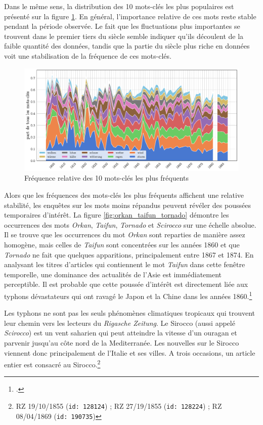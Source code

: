 \documentclass[a4paper,twoside,12pt]{article}
\begin{document}
Dans le même sens, la distribution des 10 mots-clés les plus populaires est présenté sur la figure \ref{fig:top_keywords10}. En général, l'importance relative de ces mots reste stable pendant la période observée. Le fait que les fluctuations plus importantes se trouvent dans le premier tiers du siècle semble indiquer qu'ils découlent de la faible quantité des données, tandis que la partie du siècle plus riche en données voit une stabilisation de la fréquence de ces mots-clés.

\begin{figure}[h]
    \centering
    \includegraphics[width=\textwidth]{images/10_most_frequent_ents.pdf}
    \caption{Fréquence relative des 10 mots-clés les plus fréquents}
    \label{fig:top_keywords10}
\end{figure}

Alors que les fréquences des mots-clés les plus fréquents affichent une relative stabilité, les enquêtes sur les mots moins répandus peuvent révéler des poussées temporaires d'intérêt. La figure \ref{fig:orkan_taifun_tornado} démontre les occurrences des mots \textit{Orkan}, \textit{Taifun}, \textit{Tornado} et \textit{Scirocco} sur une échelle absolue. Il se trouve que les occurrences du mot \textit{Orkan} sont reparties de manière assez homogène, mais celles de \textit{Taifun} sont concentrées sur les années 1860 et que \textit{Tornado} ne fait que quelques apparitions, principalement entre 1867 et 1874. En analysant les titres d'articles qui contiennent le mot \textit{Taifun} dans cette fenêtre temporelle, une dominance des actualités de l'Asie est immédiatement perceptible. Il est probable que cette poussée d'intérêt est directement liée aux typhons dévastateurs qui ont ravagé le Japon et la Chine dans les années 1860.\footcite{yim_reconstruction_2007}

Les typhons ne sont pas les seuls phénomènes climatiques tropicaux qui trouvent leur chemin vers les lecteurs du \textit{Rigasche Zeitung}. Le Sirocco (aussi appelé \textit{Scirocco}) est un vent saharien qui peut atteindre la vitesse d'un ouragan et parvenir jusqu'au côte nord de la Mediterranée. Les nouvelles sur le Sirocco viennent donc principalement de l'Italie et ses villes. A trois occasions, un article entier est consacré au Sirocco.\footnote{RZ 19/10/1855 (\texttt{id: 128124}) ; RZ 27/19/1855 (\texttt{id: 128224}) ; RZ 08/04/1869 (\texttt{id: 190735})}
\end{document}

